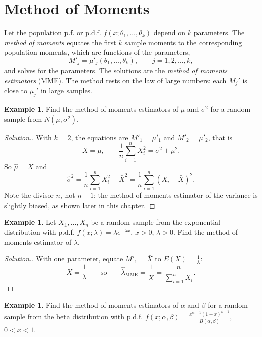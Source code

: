\documentclass[12pt,a4paper]{report}
\theoremstyle{definition}
\newtheorem{example}[thm]{Example}
\theoremstyle{plain}
\newenvironment{solution}
  {\renewcommand{\qedsymbol}{}\begin{proof}[\textit{Solution}.]}
  {\end{proof}}
\begin{document}
\section{Method of Moments}

Let the population p.f. or p.d.f. $f(x;\theta_1, \dots , \theta_k)$ depend on $k$
parameters. The \emph{method of moments} equates the first $k$ sample moments to
the corresponding population moments, which are functions of the parameters,
\[M'_j = \mu'_j(\theta_1,\dots,\theta_k),\qquad j = 1,2,\dots,k ,\]
and solves for the parameters. The solutions are the \emph{method of moments
estimators} (MME). The method rests on the law of large numbers: each $M_j'$ is
close to $\mu_j'$ in large samples.

\begin{example}
\label{ex:mmenormal}
Find the method of moments estimators of $\mu$ and $\sigma^2$ for a random
sample from $N(\mu,\sigma^2)$.
\end{example}

\begin{solution}
With $k = 2$, the equations are $M'_1 = \mu'_1$ and $M'_2 = \mu'_2$, that is
\[\bar{X} = \mu ,\qquad \frac{1}{n}\sum^n_{i = 1} X^2_i = \sigma^2 + \mu^2 .\]
So $\hat{\mu} = \bar{X}$ and
\[\hat\sigma^2 = \frac{1}{n}\sum_{i=1}^n X_i^2 - \bar{X}^2 = \frac{1}{n}\sum_{i=1}^n
(X_i - \bar{X})^2 .\]
Note the divisor $n$, not $n - 1$: the method of moments estimator of the
variance is slightly biased, as shown later in this chapter.
\end{solution}

\begin{example}
\label{ex:mmeexp}
Let $X_1, \dots , X_n$ be a random sample from the exponential distribution with
p.d.f. $f(x;\lambda) = \lambda e^{-\lambda x}$, $x>0$, $\lambda>0$. Find the
method of moments estimator of $\lambda$.
\end{example}

\begin{solution}
With one parameter, equate $M'_1 = \bar X$ to $E(X) = \frac{1}{\lambda}$:
\[\bar X = \frac{1}{\lambda}\qquad\text{so}\qquad \hat{\lambda}_{\text{MME}} =
\frac{1}{\bar X} = \frac{n}{\sum_{i=1}^n X_i} .\]
\end{solution}

\begin{example}
\label{ex:mmebeta}
Find the method of moments estimators of $\alpha$ and $\beta$ for a random sample
from the beta distribution with p.d.f.
$f(x;\alpha,\beta) = \frac{x^{\alpha-1}(1-x)^{\beta-1}}{B(\alpha,\beta)}$,
$0<x<1$.
\end{example}
\end{document}
